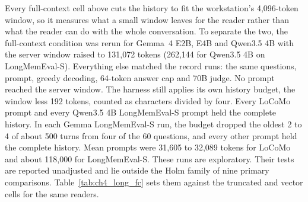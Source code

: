 Every full-context cell above cuts the history to fit the workstation's 4,096-token window, so it
measures what a small window leaves for the reader rather than what the reader can do with the whole
conversation. To separate the two, the full-context condition was rerun for Gemma~4 E2B, E4B and
Qwen3.5 4B with the server window raised to 131,072 tokens (262,144 for Qwen3.5 4B on
LongMemEval-S). Everything else matched the record runs: the same questions, prompt, greedy
decoding, 64-token answer cap and 70B judge. No prompt reached the server window. The harness still
applies its own history budget, the window less 192 tokens, counted as characters divided by four.
Every LoCoMo prompt and every Qwen3.5 4B LongMemEval-S prompt held the complete history. In each
Gemma LongMemEval-S run, the budget dropped the oldest 2 to 4 of about 500 turns from four of the 60
questions, and every other prompt held the complete history. Mean prompts were 31,605 to 32,089 tokens
for LoCoMo and about 118,000 for LongMemEval-S. These runs are exploratory. Their tests are reported unadjusted and lie outside the
Holm family of nine primary comparisons. Table~\ref{tab:ch4_long_fc} sets them against the
truncated and vector cells for the same readers.


